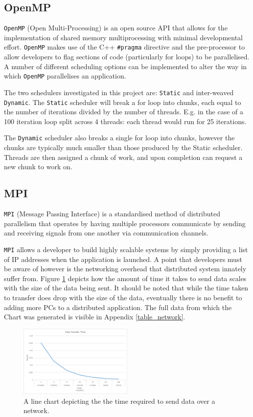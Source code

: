 \documentclass[journal,transmag]{IEEEtran}
\begin{document}
	\subsection{OpenMP}
		\texttt{OpenMP} (Open Multi-Processing) is an open source API that allows for the implementation of shared memory multiprocessing with minimal developmental effort. \texttt{OpenMP} makes use of the C++ \texttt{\#pragma} directive and the pre-processor to allow developers to flag sections of code (particularly for loops) to be parallelised. A number of different scheduling options can be implemented to alter the way in which \texttt{OpenMP} parallelises an application.
		
		The two schedulers investigated in this project are: \texttt{Static} and inter-weaved \texttt{Dynamic}. The \texttt{Static} scheduler will break a for loop into chunks, each equal to the number of iterations divided by the number of threads. E.g. in the case of a 100 iteration loop split across 4 threads: each thread would run for 25 iterations.
		
		The \texttt{Dynamic} scheduler also breaks a single for loop into chunks, however the chunks are typically much smaller than those produced by the Static scheduler. Threads are then assigned a chunk of work, and upon completion can request a new chunk to work on.
		

	\subsection{MPI}
		\texttt{MPI} (Message Passing Interface) is a standardised method of distributed parallelism that operates by having multiple processors communicate by sending and receiving signals from one another via communication channels. 
		
		\texttt{MPI} allows a developer to build highly scalable systems by simply providing a list of IP addresses when the application is launched. A point that developers must be aware of however is the networking overhead that distributed system innately suffer from. Figure \ref{fig_network} depicts how  the amount of time it takes to send data scales with the size of the data being sent. It should be noted that while the time taken to transfer does drop with the size of the data, eventually there is no benefit to adding more PCs to a distributed application. The full data from which the Chart was generated is visible in Appendix \ref{table_network}.

		\begin{figure}[]
			\centering
			\includegraphics[width = 0.5\textwidth]{chartNetwork}
			\caption{A line chart depicting the the time required to send data over a network.}
			\label{fig_network}
		\end{figure}
		
\end{document}
